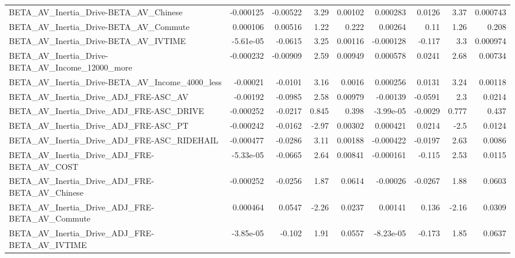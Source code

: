 \begin{tabular}{lrrrrrrrr}
BETA\_AV\_Inertia\_Drive-BETA\_AV\_Chinese              &   -0.000125 &     -0.00522 &     3.29 &  0.00102 &   0.000283 &      0.0126 &         3.37 &      0.000743 \\
BETA\_AV\_Inertia\_Drive-BETA\_AV\_Commute              &    0.000106 &      0.00516 &     1.22 &    0.222 &    0.00264 &        0.11 &         1.26 &         0.208 \\
BETA\_AV\_Inertia\_Drive-BETA\_AV\_IVTIME               &   -5.61e-05 &      -0.0615 &     3.25 &  0.00116 &  -0.000128 &      -0.117 &          3.3 &      0.000974 \\
BETA\_AV\_Inertia\_Drive-BETA\_AV\_Income\_12000\_more    &   -0.000232 &     -0.00909 &     2.59 &  0.00949 &   0.000578 &      0.0241 &         2.68 &       0.00734 \\
BETA\_AV\_Inertia\_Drive-BETA\_AV\_Income\_4000\_less     &    -0.00021 &      -0.0101 &     3.16 &   0.0016 &   0.000256 &      0.0131 &         3.24 &       0.00118 \\
BETA\_AV\_Inertia\_Drive\_ADJ\_FRE-ASC\_AV               &    -0.00192 &      -0.0985 &     2.58 &  0.00979 &   -0.00139 &     -0.0591 &          2.3 &        0.0214 \\
BETA\_AV\_Inertia\_Drive\_ADJ\_FRE-ASC\_DRIVE            &   -0.000252 &      -0.0217 &    0.845 &    0.398 &  -3.99e-05 &     -0.0029 &        0.777 &         0.437 \\
BETA\_AV\_Inertia\_Drive\_ADJ\_FRE-ASC\_PT               &   -0.000242 &      -0.0162 &    -2.97 &  0.00302 &   0.000421 &      0.0214 &         -2.5 &        0.0124 \\
BETA\_AV\_Inertia\_Drive\_ADJ\_FRE-ASC\_RIDEHAIL         &   -0.000477 &      -0.0286 &     3.11 &  0.00188 &  -0.000422 &     -0.0197 &         2.63 &        0.0086 \\
BETA\_AV\_Inertia\_Drive\_ADJ\_FRE-BETA\_AV\_COST         &   -5.33e-05 &      -0.0665 &     2.64 &  0.00841 &  -0.000161 &      -0.115 &         2.53 &        0.0115 \\
BETA\_AV\_Inertia\_Drive\_ADJ\_FRE-BETA\_AV\_Chinese      &   -0.000252 &      -0.0256 &     1.87 &   0.0614 &   -0.00026 &     -0.0267 &         1.88 &        0.0603 \\
BETA\_AV\_Inertia\_Drive\_ADJ\_FRE-BETA\_AV\_Commute      &    0.000464 &       0.0547 &    -2.26 &   0.0237 &    0.00141 &       0.136 &        -2.16 &        0.0309 \\
BETA\_AV\_Inertia\_Drive\_ADJ\_FRE-BETA\_AV\_IVTIME       &   -3.85e-05 &       -0.102 &     1.91 &   0.0557 &  -8.23e-05 &      -0.173 &         1.85 &        0.0637 \\

\end{tabular}
